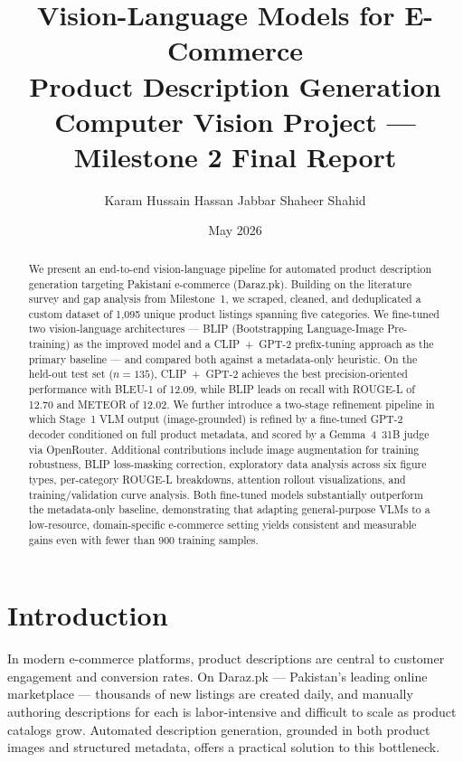 \documentclass[12pt,a4paper]{article}
\title{
  \textbf{Vision-Language Models for E-Commerce\\Product Description Generation}\\[0.5em]
  \large Computer Vision Project --- Milestone 2 Final Report
}
\author{
  Karam Hussain \quad Hassan Jabbar \quad Shaheer Shahid
}
\date{May 2026}
\begin{document}
\maketitle
\tableofcontents
\newpage

\begin{abstract}
We present an end-to-end vision-language pipeline for automated product description
generation targeting Pakistani e-commerce (Daraz.pk). Building on the literature survey
and gap analysis from Milestone~1, we scraped, cleaned, and deduplicated a custom
dataset of 1,095 unique product listings spanning five categories. We fine-tuned two
vision-language architectures --- BLIP (Bootstrapping Language-Image Pre-training) as
the improved model and a CLIP~+~GPT-2 prefix-tuning approach as the primary baseline
--- and compared both against a metadata-only heuristic. On the held-out test set
($n=135$), CLIP~+~GPT-2 achieves the best precision-oriented performance with BLEU-1
of 12.09, while BLIP leads on recall with ROUGE-L of 12.70 and METEOR of 12.02.
We further introduce a two-stage refinement pipeline in which Stage~1 VLM output
(image-grounded) is refined by a fine-tuned GPT-2 decoder conditioned on full product
metadata, and scored by a Gemma~4~31B judge via OpenRouter. Additional contributions
include image augmentation for training robustness, BLIP loss-masking correction,
exploratory data analysis across six figure types, per-category ROUGE-L breakdowns,
attention rollout visualizations, and training/validation curve analysis. Both
fine-tuned models substantially outperform the metadata-only baseline, demonstrating
that adapting general-purpose VLMs to a low-resource, domain-specific e-commerce
setting yields consistent and measurable gains even with fewer than 900 training samples.
\end{abstract}

\section{Introduction}

In modern e-commerce platforms, product descriptions are central to customer engagement
and conversion rates. On Daraz.pk --- Pakistan's leading online marketplace --- thousands
of new listings are created daily, and manually authoring descriptions for each is
labor-intensive and difficult to scale as product catalogs grow. Automated description
generation, grounded in both product images and structured metadata, offers a practical
solution to this bottleneck.
\end{document}
